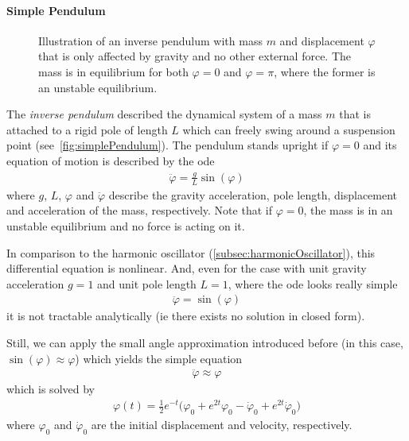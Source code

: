 		\paragraph{Simple Pendulum}
			\label{subsec:simplePendulum}

			\begin{figure}
				\centering
				\tikzSimplePendulum
				\caption{Illustration of an inverse pendulum with mass \(m\) and displacement \(\varphi\) that is only affected by gravity and no other external force. The mass is in equilibrium for both \( \varphi = 0 \) and \( \varphi = \pi \), where the former is an unstable equilibrium.}
				\label{fig:simplePendulum}
			\end{figure}

			The \emph{inverse pendulum} described the dynamical system of a mass \(m\) that is attached to a rigid pole of length \(L\) which can freely swing around a suspension point (see~\autoref{fig:simplePendulum}). The pendulum stands upright if \( \varphi = 0 \) and its equation of motion is described by the \ac{ode}
			\begin{align*}
				\ddot{\varphi} = \frac{g}{L} \sin(\varphi)
			\end{align*}
			where \(g\), \(L\), \(\varphi\) and \(\ddot{\varphi}\) describe the gravity acceleration, pole length, displacement and acceleration of the mass, respectively. Note that if \( \varphi = 0 \), the mass is in an unstable equilibrium and no force is acting on it.

			In comparison to the harmonic oscillator (\autoref{subsec:harmonicOscillator}), this differential equation is nonlinear. And, even for the case with unit gravity acceleration \( g = 1 \) and unit pole length \( L = 1\), where the \ac{ode} looks really simple
			\begin{align}
				\ddot{\varphi} = \sin(\varphi)  \label{eq:inversePendulum}
			\end{align}
			it is not tractable analytically (\ac{ie} there exists no solution in closed form).

			Still, we can apply the small angle approximation introduced before (in this case, \( \sin(\varphi) \approx \varphi \)) which yields the simple equation
			\begin{align}
				\ddot{\varphi} \approx \varphi  \label{eq:linearizedInversePendulum}
			\end{align}
			which is solved by
			\begin{align*}
				\varphi(t) = \frac{1}{2} e^{-t} \big(\varphi_0 + e^{2t} \varphi_0 - \dot{\varphi}_0 + e^{2t} \dot{\varphi}_0\big)
			\end{align*}
			where \(\varphi_0\) and \(\dot{\varphi}_0\) are the initial displacement and velocity, respectively.

